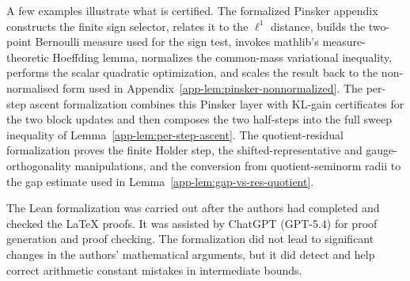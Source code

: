 \documentclass{article}
\theoremstyle{plain}
\begin{document}
A few examples illustrate what is certified.  The formalized Pinsker appendix constructs the finite sign selector, relates it to the $\ell^1$ distance, builds the two-point Bernoulli measure used for the sign test, invokes mathlib's measure-theoretic Hoeffding lemma, normalizes the common-mass variational inequality, performs the scalar quadratic optimization, and scales the result back to the non-normalised form used in Appendix~\ref{app-lem:pinsker-nonnormalized}.  The per-step ascent formalization combines this Pinsker layer with KL-gain certificates for the two block updates and then composes the two half-steps into the full sweep inequality of Lemma~\ref{app-lem:per-step-ascent}.  The quotient-residual formalization proves the finite Holder step, the shifted-representative and gauge-orthogonality manipulations, and the conversion from quotient-seminorm radii to the gap estimate used in Lemma~\ref{app-lem:gap-vs-res-quotient}.

The Lean formalization was carried out after the authors had completed and checked the LaTeX proofs. It was assisted by ChatGPT (GPT-5.4) for proof generation and proof checking. The formalization did not lead to significant changes in the authors' mathematical arguments, but it did detect and help correct arithmetic constant mistakes in intermediate bounds.


\end{document}
